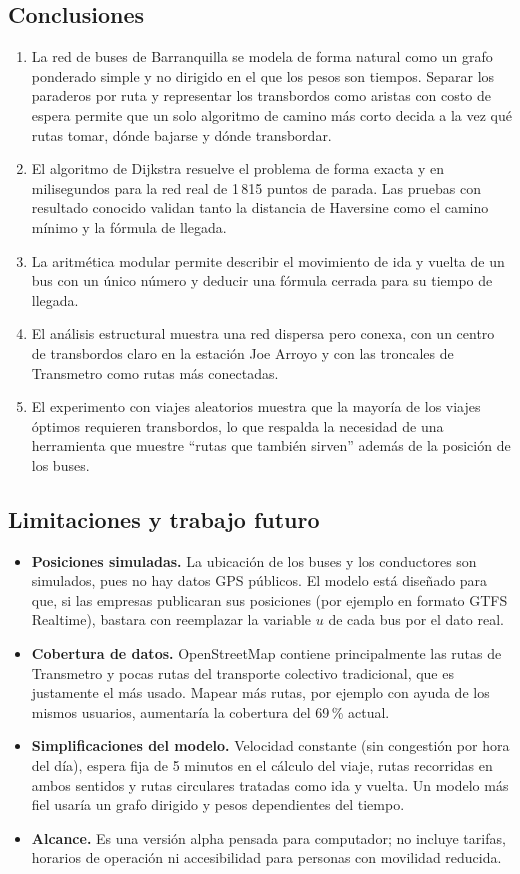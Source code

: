 \documentclass[12pt,letterpaper]{article}
\begin{document}
\subsection{Conclusiones}
\begin{enumerate}
\item La red de buses de Barranquilla se modela de forma natural como un grafo ponderado simple y no dirigido en el que los pesos son tiempos. Separar los paraderos por ruta y representar los transbordos como aristas con costo de espera permite que un solo algoritmo de camino más corto decida a la vez qué rutas tomar, dónde bajarse y dónde transbordar.
\item El algoritmo de Dijkstra resuelve el problema de forma exacta y en milisegundos para la red real de 1\,815 puntos de parada. Las pruebas con resultado conocido validan tanto la distancia de Haversine como el camino mínimo y la fórmula de llegada.
\item La aritmética modular permite describir el movimiento de ida y vuelta de un bus con un único número y deducir una fórmula cerrada para su tiempo de llegada.
\item El análisis estructural muestra una red dispersa pero conexa, con un centro de transbordos claro en la estación Joe Arroyo y con las troncales de Transmetro como rutas más conectadas.
\item El experimento con viajes aleatorios muestra que la mayoría de los viajes óptimos requieren transbordos, lo que respalda la necesidad de una herramienta que muestre ``rutas que también sirven'' además de la posición de los buses.
\end{enumerate}

\subsection{Limitaciones y trabajo futuro}
\begin{itemize}
\item \textbf{Posiciones simuladas.} La ubicación de los buses y los conductores son simulados, pues no hay datos GPS públicos. El modelo está diseñado para que, si las empresas publicaran sus posiciones (por ejemplo en formato GTFS Realtime), bastara con reemplazar la variable $u$ de cada bus por el dato real.
\item \textbf{Cobertura de datos.} OpenStreetMap contiene principalmente las rutas de Transmetro y pocas rutas del transporte colectivo tradicional, que es justamente el más usado. Mapear más rutas, por ejemplo con ayuda de los mismos usuarios, aumentaría la cobertura del 69\,\% actual.
\item \textbf{Simplificaciones del modelo.} Velocidad constante (sin congestión por hora del día), espera fija de 5 minutos en el cálculo del viaje, rutas recorridas en ambos sentidos y rutas circulares tratadas como ida y vuelta. Un modelo más fiel usaría un grafo dirigido y pesos dependientes del tiempo.
\item \textbf{Alcance.} Es una versión alpha pensada para computador; no incluye tarifas, horarios de operación ni accesibilidad para personas con movilidad reducida.
\end{itemize}
\end{document}
